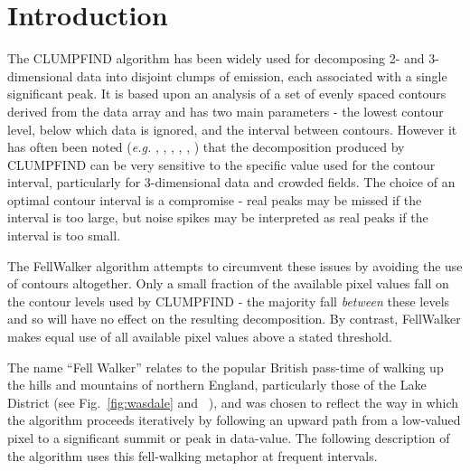 \documentclass[final,authoryear,5p,times,twocolumn]{elsarticle}
\begin{document}

\newcommand{\mnras}{Mon Not R Astron Soc}
\newcommand{\aap}{Astron Astrophys}
\newcommand{\aaps}{Astron Astrophys Supp}
\newcommand{\pasp}{Pub Astron Soc Pacific}
\newcommand{\apj}{Astrophys J}
\newcommand{\apjs}{Astrophys J Supp}
\newcommand{\qjras}{Quart J R Astron Soc}
\newcommand{\an}{Astron.\ Nach.}
\newcommand{\ijimw}{Int.\ J.\ Infrared \& Millimeter Waves}
\newcommand{\procspie}{Proc.\ SPIE}
\newcommand{\aspconf}{ASP Conf. Ser.}

\newcommand{\ascl}[1]{\href{http://www.ascl.net/#1}{ascl:#1}}

\section{Introduction}
\label{sec:intro}

The CLUMPFIND algorithm \citep[][\ascl{1107.014}]{1994Williams} has been
widely used for decomposing 2- and 3-dimensional data into disjoint
clumps of emission, each associated with a single significant peak. It is
based upon an analysis of a set of evenly spaced contours derived from
the data array and has two main parameters - the lowest contour level,
below which data is ignored, and the interval between contours. However
it has often been noted (\emph{e.g.} \citet{2014Christie},
\citet{2009Kainulainen}, \citet{2009Pineda}, \citet{2008Smith}, \citet{2007Elia},
\citet{2003Brunt}) that the decomposition produced by CLUMPFIND can be very
sensitive to the specific value used for the contour interval, particularly
for 3-dimensional data and crowded fields. The choice of an optimal contour
interval is a compromise - real peaks may be missed if the interval is too
large, but noise spikes may be interpreted as real peaks if the interval is
too small.

The FellWalker algorithm attempts to circumvent these issues by avoiding
the use of contours altogether. Only a small fraction of the available
pixel values fall on the contour levels used by CLUMPFIND - the majority
fall \emph{between} these levels and so will have no effect on the
resulting decomposition. By contrast, FellWalker makes equal use of all
available pixel values above a stated threshold.

The name ``Fell Walker'' relates to the popular British pass-time of
walking up the hills and mountains of northern England, particularly
those of the Lake District (see Fig.~\ref{fig:wasdale} and
~), and was
chosen to reflect the way in which the algorithm proceeds iteratively by
following an upward path from a low-valued pixel to a significant summit
or peak in data-value. The following description of the algorithm uses
this fell-walking metaphor at frequent intervals.
\end{document}
